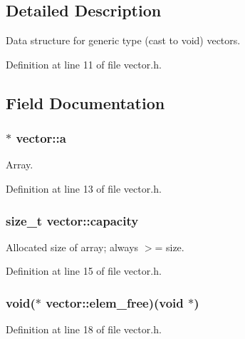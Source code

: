 \subsection{\-Detailed \-Description}
\-Data structure for generic type (cast to void) vectors. 

\-Definition at line 11 of file vector.\-h.



\subsection{\-Field \-Documentation}
\hypertarget{structvector_ae086a0bd5a910803add11ed953819018}{
\subsubsection[{a}]{$\ast$ {\bf vector\-::a}}}\label{structvector_ae086a0bd5a910803add11ed953819018}


\-Array. 



\-Definition at line 13 of file vector.\-h.

\hypertarget{structvector_a59f95fbd95d6f3e84e98a722a66e629a}{
\subsubsection[{capacity}]{\setlength{\rightskip}{0pt plus 5cm}size\-\_\-t {\bf vector\-::capacity}}}\label{structvector_a59f95fbd95d6f3e84e98a722a66e629a}


\-Allocated size of array; always $>$= size. 



\-Definition at line 15 of file vector.\-h.

\hypertarget{structvector_aa707fd886c386fe365b6d6dbadb49733}{
\subsubsection[{elem\-\_\-free}]{\setlength{\rightskip}{0pt plus 5cm}void($\ast$ {\bf vector\-::elem\-\_\-free})(void $\ast$)}}\label{structvector_aa707fd886c386fe365b6d6dbadb49733}


\-Definition at line 18 of file vector.\-h.

